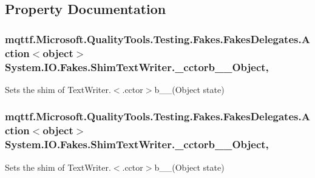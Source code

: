 \subsection{Property Documentation}
\hypertarget{class_system_1_1_i_o_1_1_fakes_1_1_shim_text_writer_a797dd2c65261edfb8d457edc1526935f}{
\subsubsection[{\-\_\-cctorb\-\_\-\-\_\-0\-Object}]{\setlength{\rightskip}{0pt plus 5cm}mqttf.\-Microsoft.\-Quality\-Tools.\-Testing.\-Fakes.\-Fakes\-Delegates.\-Action$<$object$>$ System.\-I\-O.\-Fakes.\-Shim\-Text\-Writer.\-\_\-cctorb\-\_\-\-\_\-Object\hspace{0.3cm}{\ttfamily [static]}, {\ttfamily [set]}}}\label{class_system_1_1_i_o_1_1_fakes_1_1_shim_text_writer_a797dd2c65261edfb8d457edc1526935f}


Sets the shim of Text\-Writer.$<$.cctor$>$b\-\_\-\-\_(\-Object state)

\hypertarget{class_system_1_1_i_o_1_1_fakes_1_1_shim_text_writer_a497a0d50e435f52413334ace8465aa67}{
\subsubsection[{\-\_\-cctorb\-\_\-\-\_\-1\-Object}]{\setlength{\rightskip}{0pt plus 5cm}mqttf.\-Microsoft.\-Quality\-Tools.\-Testing.\-Fakes.\-Fakes\-Delegates.\-Action$<$object$>$ System.\-I\-O.\-Fakes.\-Shim\-Text\-Writer.\-\_\-cctorb\-\_\-\-\_\-Object\hspace{0.3cm}{\ttfamily [static]}, {\ttfamily [set]}}}\label{class_system_1_1_i_o_1_1_fakes_1_1_shim_text_writer_a497a0d50e435f52413334ace8465aa67}


Sets the shim of Text\-Writer.$<$.cctor$>$b\-\_\-\-\_(\-Object state)

